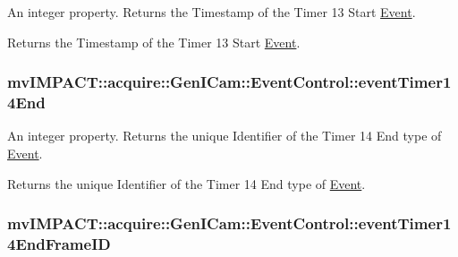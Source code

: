 An integer property. Returns the Timestamp of the Timer 13 Start \hyperlink{classmv_i_m_p_a_c_t_1_1acquire_1_1_event}{Event}. 

Returns the Timestamp of the Timer 13 Start \hyperlink{classmv_i_m_p_a_c_t_1_1acquire_1_1_event}{Event}. \hypertarget{classmv_i_m_p_a_c_t_1_1acquire_1_1_gen_i_cam_1_1_event_control_a1005dfcf7d3ef5d008897f30534be2ad}{
\subsubsection[{event\+Timer14\+End}]{ mv\+I\+M\+P\+A\+C\+T\+::acquire\+::\+Gen\+I\+Cam\+::\+Event\+Control\+::event\+Timer14\+End}}\label{classmv_i_m_p_a_c_t_1_1acquire_1_1_gen_i_cam_1_1_event_control_a1005dfcf7d3ef5d008897f30534be2ad}


An integer property. Returns the unique Identifier of the Timer 14 End type of \hyperlink{classmv_i_m_p_a_c_t_1_1acquire_1_1_event}{Event}. 

Returns the unique Identifier of the Timer 14 End type of \hyperlink{classmv_i_m_p_a_c_t_1_1acquire_1_1_event}{Event}. \hypertarget{classmv_i_m_p_a_c_t_1_1acquire_1_1_gen_i_cam_1_1_event_control_a3825bcea903814c269d3a75f384dd7c3}{
\subsubsection[{event\+Timer14\+End\+Frame\+I\+D}]{ mv\+I\+M\+P\+A\+C\+T\+::acquire\+::\+Gen\+I\+Cam\+::\+Event\+Control\+::event\+Timer14\+End\+Frame\+I\+D}}\label{classmv_i_m_p_a_c_t_1_1acquire_1_1_gen_i_cam_1_1_event_control_a3825bcea903814c269d3a75f384dd7c3}


